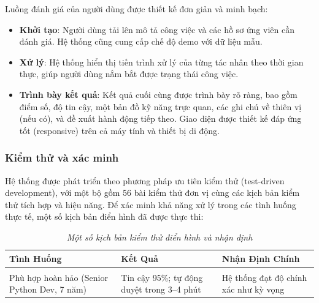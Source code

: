 \documentclass{article}
\begin{document}
\begin{itemize}[topsep=0pt, itemsep=4pt, leftmargin=40pt]
Luồng đánh giá của người dùng được thiết kế đơn giản và minh bạch:
\begin{itemize}[topsep=0pt, itemsep=4pt, leftmargin=40pt]
    \item \textbf{Khởi tạo}: Người dùng tải lên mô tả công việc và các hồ sơ ứng viên cần đánh giá. Hệ thống cũng cung cấp chế độ demo với dữ liệu mẫu.
    \item \textbf{Xử lý}: Hệ thống hiển thị tiến trình xử lý của từng tác nhân theo thời gian thực, giúp người dùng nắm bắt được trạng thái công việc.
    \item \textbf{Trình bày kết quả}: Kết quả cuối cùng được trình bày rõ ràng, bao gồm điểm số, độ tin cậy, một bản đồ kỹ năng trực quan, các ghi chú về thiên vị (nếu có), và đề xuất hành động tiếp theo. Giao diện được thiết kế đáp ứng tốt (responsive) trên cả máy tính và thiết bị di động.
\end{itemize}

\subsubsection{Kiểm thử và xác minh}
Hệ thống được phát triển theo phương pháp ưu tiên kiểm thử (test-driven development), với một bộ gồm 56 bài kiểm thử đơn vị cùng các kịch bản kiểm thử tích hợp và hiệu năng. Để xác minh khả năng xử lý trong các tình huống thực tế, một số kịch bản điển hình đã được thực thi:

\begin{longtable}{|
  >{\raggedright\arraybackslash}p{}|
  >{\raggedright\arraybackslash}p{}|
  >{\raggedright\arraybackslash}p{}|}
  \hline
  \textbf{Tình Huống} &
  \textbf{Kết Quả} &
  \textbf{Nhận Định Chính} \\
  \hline
  \endfirsthead

  \endhead

  \hline
  \endfoot

  \hline
  \caption{\centering\textit{Một số kịch bản kiểm thử điển hình và nhận định}}
  \label{tab:test-scenarios-summary} \\
  \endlastfoot

  Phù hợp hoàn hảo (Senior Python Dev, 7 năm) &
  Tin cậy 95\%; tự động duyệt trong 3–4 phút &
  Hệ thống đạt độ chính xác như kỳ vọng \\
  \hline


\end{longtable}
\end{itemize}
\end{document}
